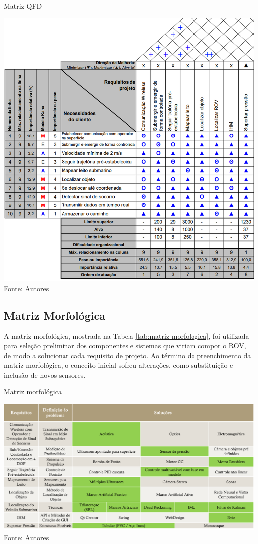 \begin{table}[h!]
	\centering
	\caption{Matriz QFD}
	\label{tab:qfd-brov-recorte}
	\includegraphics[width=1\linewidth]{images/QFD-BROV.png}\\
	\footnotesize Fonte: Autores
\end{table}

\subsection{Matriz Morfológica}
\label{subsec:matriz-morfologica}

A matriz morfológica, mostrada na Tabela \ref{tab:matriz-morfologica}, foi utilizada para seleção preliminar dos componentes e sistemas que viriam compor o ROV, de modo a solucionar cada requisito de projeto. Ao término do preenchimento da matriz morfológica, o conceito inicial sofreu alterações, como substituição e inclusão de novos sensores. 

\begin{table}[h!]
	\centering
	\caption{Matriz morfológica}
	\label{tab:matriz-morfologica}
	\includegraphics[width=1\linewidth]{images/Matriz-morfologica}\\
	\footnotesize Fonte: Autores
\end{table}

